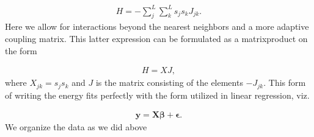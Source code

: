 \documentclass[letterpaper,10pt,english]{sphinxmanual}
\begin{document}
\begin{equation*}
\begin{split}
\begin{equation}
    H = - \sum_j^L \sum_k^L s_j s_k J_{jk}.
\label{_auto9} \tag{9}
\end{equation}
\end{split}
\end{equation*}
Here we allow for interactions beyond the nearest neighbors and a more
adaptive coupling matrix. This latter expression can be formulated as
a matrix\sphinxhyphen{}product on the form




\begin{equation*}
\begin{split}
\begin{equation}
    H = X J,
\label{_auto10} \tag{10}
\end{equation}
\end{split}
\end{equation*}
where \(X_{jk} = s_j s_k\) and \(J\) is the matrix consisting of the
elements \(-J_{jk}\). This form of writing the energy fits perfectly
with the form utilized in linear regression, viz.




\begin{equation*}
\begin{split}
\begin{equation}
    \boldsymbol{y} = \boldsymbol{X}\boldsymbol{\beta} + \boldsymbol{\epsilon}.
\label{_auto11} \tag{11}
\end{equation}
\end{split}
\end{equation*}
We organize the data as we did above
\end{document}
